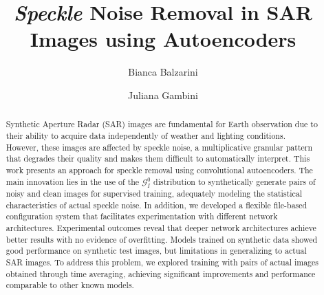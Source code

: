 \documentclass{llncs}
\begin{document}
%
\title{\emph{Speckle} Noise Removal in SAR Images using Autoencoders}

%
\author{Bianca Balzarini \and
Juliana Gambini}
%
%

%
\maketitle              %
%
\begin{abstract}
Synthetic Aperture Radar (SAR) images are fundamental for Earth observation due to their ability to acquire data
independently of weather and lighting conditions. However, these images are affected by speckle noise, a
multiplicative granular pattern that degrades their quality and makes them difficult to automatically interpret.
This work presents an approach for speckle removal using convolutional autoencoders. The main innovation lies in
the use of the $\mathcal{G}_I^0$ distribution  to synthetically generate pairs of noisy and clean images for
supervised training, adequately modeling the statistical characteristics of actual speckle noise.
In addition, we developed a flexible file-based configuration system that facilitates experimentation with
different network architectures.
Experimental outcomes reveal that deeper network architectures achieve better results with no evidence of
overfitting.
Models trained on synthetic data showed good performance on synthetic test images, but limitations in generalizing
to actual SAR images. To address this problem, we explored training with pairs of actual images obtained through time
averaging, achieving significant improvements and performance comparable to other known models.

\end{abstract}
\end{document}
